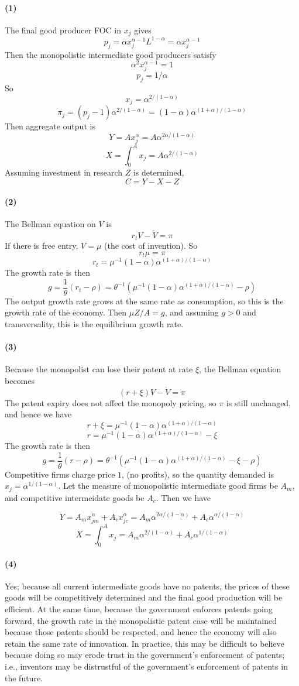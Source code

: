 \documentclass[10pt,letter]{article}
\newcommand{\problempart}[1]{\paragraph{#1}}
\begin{document}
\problempart{(1)}
The final good producer FOC in $x_j$ gives
\[ p_j = \alpha x_j^{\alpha - 1}L^{1-\alpha} = \alpha x_j^{\alpha - 1} \]
Then the monopolistic intermediate good producers satisfy
\[ \alpha^2 x_j^{\alpha - 1} = 1 \]
\[ p_j = 1/\alpha \]
So
\[ x_j = \alpha^{2/(1-\alpha)} \]
\[ \pi_j = (p_j - 1) \alpha^{2/(1-\alpha)} = (1-\alpha)\alpha^{(1+\alpha)/(1-\alpha)} \]
Then aggregate output is
\[ Y = A x_j^\alpha = A \alpha^{2\alpha/(1-\alpha)}\]
\[ X = \int_0^A x_j = A\alpha^{2/(1-\alpha)} \]
Assuming investment in research $Z$ is determined,
\[ C = Y - X - Z\]
\problempart{(2)}
The Bellman equation on $V$ is
\[ r_t V - \dot{V} = \pi \]
If there is free entry, $V = \mu$ (the cost of invention). So
\[ r_t \mu = \pi \]
\[ r_t = \mu^{-1}(1-\alpha)\alpha^{(1+\alpha)/(1-\alpha)} \]
The growth rate is then
\[ g = \frac{1}{\theta}(r_t - \rho) = \theta^{-1}(\mu^{-1}(1-\alpha)\alpha^{(1+\alpha)/(1-\alpha)} - \rho) \]
The output growth rate grows at the same rate as consumption, so this is the growth rate of the economy. Then $\mu Z/ A = g$, and assuming $g > 0$ and transversality, this is the equilibrium growth rate.
\problempart{(3)}
Because the monopolist can lose their patent at rate $\xi$, the Bellman equation becomes
\[ (r + \xi)V - \dot{V} = \pi \]
The patent expiry does not affect the monopoly pricing, so $\pi$ is still unchanged, and hence we have
\[ r + \xi = \mu^{-1}(1-\alpha)\alpha^{(1+\alpha)/(1-\alpha)} \]
\[ r = \mu^{-1}(1-\alpha)\alpha^{(1+\alpha)/(1-\alpha)} - \xi \]
The growth rate is then
\[ g = \frac{1}{\theta}(r - \rho) = \theta^{-1}(\mu^{-1}(1-\alpha)\alpha^{(1+\alpha)/(1-\alpha)} - \xi - \rho)\]
Competitive firms charge price $1$, (no profits), so the quantity demanded is $x_j = \alpha^{1/(1-\alpha)}$. Let the measure of monopolistic intermediate good firms be $A_m$, and competitive intermeidate goods be $A_c$. Then we have

\[ Y = A_m x_{jm}^\alpha + A_c x_{jc}^\alpha = A_m \alpha^{2\alpha/(1-\alpha)} + A_c \alpha^{\alpha/(1-\alpha)}\]
\[ X = \int_0^A x_j = A_m \alpha^{2/(1-\alpha)} + A_c \alpha^{1/(1-\alpha)}  \]

\problempart{(4)}
Yes; because all current intermediate goods have no patents, the prices of these goods will be competitively determined and the final good production will be efficient. At the same time, because the government enforces patents going forward, the growth rate in the monopolistic patent case will be maintained because those patents should be respected, and hence the economy will also retain the same rate of innovation. In practice, this may be difficult to believe because doing so may erode trust in the government's enforcement of patents; i.e., inventors may be distrustful of the government's enforcement of patents in the future.
\end{document}
